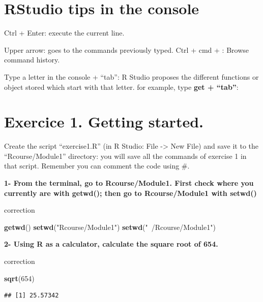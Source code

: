 \documentclass[]{book}
\newenvironment{Shaded}{\begin{snugshade}}{\end{snugshade}}
\newcommand{\DecValTok}[1]{\textcolor[rgb]{0.00,0.00,0.81}{#1}}
\newcommand{\KeywordTok}[1]{\textcolor[rgb]{0.13,0.29,0.53}{\textbf{#1}}}
\newcommand{\NormalTok}[1]{#1}
\newcommand{\StringTok}[1]{\textcolor[rgb]{0.31,0.60,0.02}{#1}}
\begin{document}
\hypertarget{rstudio-tips-in-the-console}{%
\section{RStudio tips in the console}\label{rstudio-tips-in-the-console}}

Ctrl + Enter: execute the current line.

 Upper arrow: goes to the commands previously typed.
Ctrl + cmd + : Browse command history.

 Type a letter in the console + ``tab'': R Studio proposes the different functions or object stored which start with that letter. for example, type \textbf{get + ``tab''}:

\hypertarget{exercice-1.-getting-started.}{%
\section{Exercice 1. Getting started.}\label{exercice-1.-getting-started.}}

Create the script ``exercise1.R'' (in R Studio: File -\textgreater{} New File) and save it to the ``Rcourse/Module1'' directory: you will save all the commands of exercise 1 in that script.
Remember you can comment the code using \#.

\textbf{1- From the terminal, go to Rcourse/Module1.
First check where you currently are with getwd();
then go to Rcourse/Module1 with setwd()}

correction

\begin{Shaded}
\begin{Highlighting}[]
\KeywordTok{getwd}\NormalTok{()}
\KeywordTok{setwd}\NormalTok{(}\StringTok{"Rcourse/Module1"}\NormalTok{)}
\KeywordTok{setwd}\NormalTok{(}\StringTok{"~/Rcourse/Module1"}\NormalTok{)}
\end{Highlighting}
\end{Shaded}

\textbf{2- Using R as a calculator, calculate the square root of 654.}

correction

\begin{Shaded}
\begin{Highlighting}[]
\KeywordTok{sqrt}\NormalTok{(}\DecValTok{654}\NormalTok{)}
\end{Highlighting}
\end{Shaded}

\begin{verbatim}
## [1] 25.57342
\end{verbatim}
\end{document}
